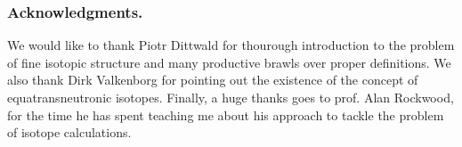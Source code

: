\subsubsection*{Acknowledgments.}

We would like to thank Piotr Dittwald for thourough introduction to the problem of fine isotopic structure and many productive brawls over proper definitions. We also thank Dirk Valkenborg for pointing out the existence of the concept of equatransneutronic isotopes. Finally, a huge thanks goes to prof. Alan Rockwood, for the time he has spent teaching me about his approach to tackle the problem of isotope calculations.